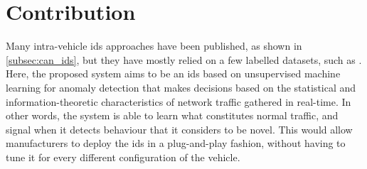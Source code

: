 \chapter{Contribution}
\label{c:contribution}

Many intra-vehicle \gls{ids} approaches have been published, as shown in \ref{subsec:can_ids}, but they have mostly relied on a few labelled datasets, such as \cite{CANDataset_Car-Hacking}. Here, the proposed system aims to be an \gls{ids} based on unsupervised machine learning for anomaly detection that makes decisions based on the statistical and information-theoretic characteristics of network traffic gathered in real-time. In other words, the system is able to learn what constitutes normal traffic, and signal when it detects behaviour that it considers to be novel. This would allow manufacturers to deploy the \gls{ids} in a plug-and-play fashion, without having to tune it for every different configuration of the vehicle.